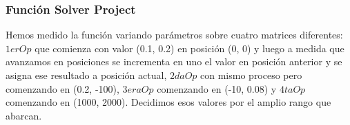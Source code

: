\subsubsection{Función Solver Project}
Hemos medido la función variando parámetros sobre cuatro matrices diferentes: $1erOp$ que comienza con valor (0.1, 0.2) en posición (0, 0) y luego a medida que avanzamos en posiciones se incrementa en uno el valor en posición anterior y se asigna ese resultado a posición actual, $2daOp$ con mismo proceso pero comenzando en (0.2, -100), $3eraOp$ comenzando en (-10, 0.08) y $4taOp$ comenzando en (1000, 2000). Decidimos esos valores por el amplio rango que abarcan.


